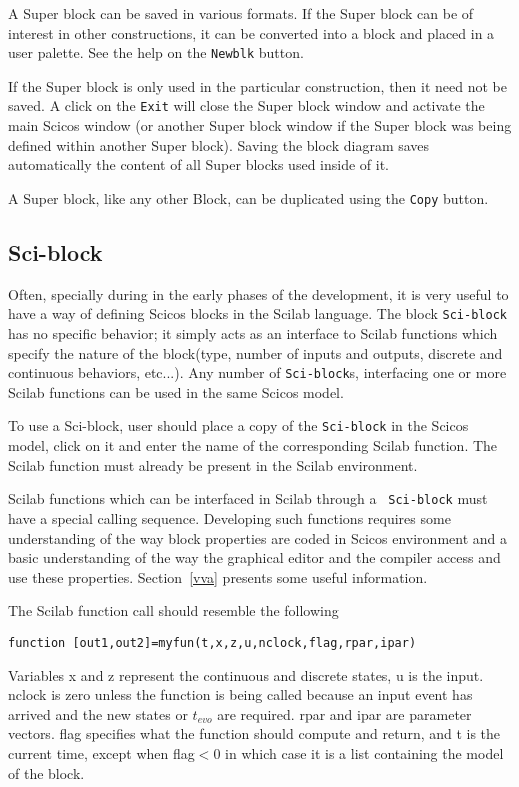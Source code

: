 A Super block can be saved in various formats. If the Super block can
be of interest in other constructions, it can be converted into a
block and placed in a user palette. See the help on the {\tt Newblk}
button. 

If the Super block is only used in the particular construction, then
it need not be saved. A click on the {\tt Exit} will close the Super
block window and activate the main Scicos   window (or another Super
block window if the Super block was being defined within another Super
block). Saving the block diagram saves automatically the content of
all Super blocks used inside of it.

A Super block, like any other Block, can be duplicated using
the {\tt Copy} button.

\subsection{Sci-block} 
Often, specially during in the early phases of the development, it is
very useful to have a way of defining Scicos   blocks in the Scilab
language. The block {\tt Sci-block} has no specific behavior; it 
simply acts as an interface to Scilab functions which specify the
nature of the block(type, number of inputs and outputs, discrete and
continuous behaviors, etc...).
Any number of {\tt Sci-block}s, interfacing one or more Scilab
functions can be used in the same Scicos  model. 

To use a Sci-block, user should place a copy of the {\tt Sci-block} in the
Scicos   model, click on it and enter the name of
the corresponding Scilab function. The Scilab function must already be
present in the Scilab environment. 

Scilab functions which can be interfaced in Scilab through a {\tt
Sci-block} must have a special calling sequence. Developing such
functions requires some understanding of the way block properties
are coded in Scicos   environment and a basic understanding of the way
the graphical editor and the compiler access and use these
properties. Section~\ref{vva} presents some useful information. 

The Scilab function call should resemble the following
\begin{verbatim}
function [out1,out2]=myfun(t,x,z,u,nclock,flag,rpar,ipar)
\end{verbatim}
Variables x and z represent the
continuous and discrete states, u is the input. nclock is zero unless
the function is being called because an input event has arrived and
the new states or $t_{evo}$ are required. rpar and ipar are parameter
vectors. flag specifies what the function should compute and return,
and t is the current time, except when flag$<0$ in which case it is a
list containing the model of the block. 

